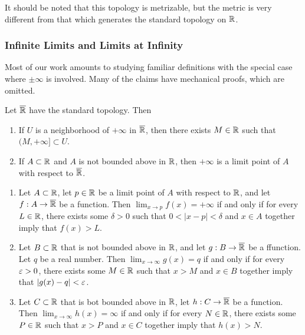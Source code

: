 \documentclass[12pt]{article} %
\begin{document}
\noindent It should be noted that this topology is metrizable, but the metric is very different from that which generates the standard topology on $\mathbb{R}$.

\subsubsection{Infinite Limits and Limits at Infinity}

Most of our work amounts to studying familiar definitions with the special case where $\pm \infty$ is involved. Many of the claims have mechanical proofs, which are omitted.

\begin{proposition}
    Let $\overline{\mathbb{R}}$ have the standard topology. Then \begin{enumerate}
        \item If $U$ is a neighborhood of $+\infty$ in $\overline{\mathbb{R}}$, then there exists $M \in \mathbb{R}$ such that $(M, +\infty] \subset U$.
        \item If $A \subset \mathbb{R}$ and $A$ is not bounded above in $\mathbb{R}$, then $+\infty$ is a limit point of $A$ with respect to $\overline{\mathbb{R}}$.
    \end{enumerate}
\end{proposition}

\begin{proposition}
    \begin{enumerate}
        \item Let $A \subset \mathbb{R}$, let $p \in \mathbb{R}$ be a limit point of $A$ with respect to $\mathbb{R}$, and let $f : A \to \overline{\mathbb{R}}$ be a function. Then $\lim_{x \to p} f(x) = +\infty$ if and only if for every $L \in \mathbb{R}$, there exists some $\delta > 0$ such that $0 < |x-p| < \delta$ and $x \in A$ together imply that $f(x) > L$.
        \item Let $B \subset \mathbb{R}$ that is not bounded above in $\mathbb{R}$, and let $g : B \to \overline{\mathbb{R}}$ be a ffunction. Let $q$ be a real number. Then $\lim_{x \to \infty} g(x) = q$ if and only if for every $\varepsilon > 0$, there exists some $M \in \mathbb{R}$ such that $x > M$ and $x \in B$ together imply that $|g(x) - q| < \varepsilon$.
        \item Let $C \subset \mathbb{R}$ that is bot bounded above in $\mathbb{R}$, let $h : C \to \overline{\mathbb{R}}$ be a function. Then $\lim_{x \to \infty} h(x) = \infty$ if and only if for every $N \in \mathbb{R}$, there exists some $P \in \mathbb{R}$ such that $x > P$ and $x \in C$ together imply that $h(x) > N$.
    \end{enumerate}
\end{proposition}
\end{document}
